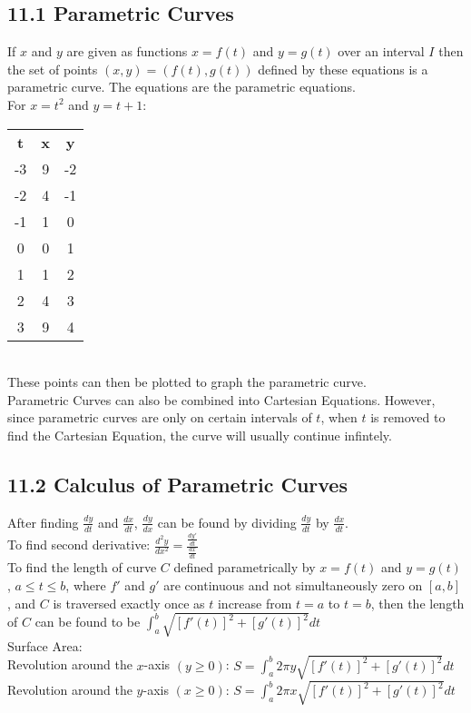\documentclass{article}
\begin{document}
        \subsection*{11.1 Parametric Curves}
            If $x$ and $y$ are given as functions $x=f(t)$ and $y=g(t)$ over an interval $I$ then the set of points $(x, y) = (f(t), g(t))$ defined by these equations is a parametric curve. The equations are the parametric equations. \\
            For $x=t^2$ and $y=t+1$: \\
            \begin{tabular}{ c c c }
                \textbf{t} & \textbf{x} & \textbf{y} \\
                -3 & 9 & -2 \\
                -2 & 4 & -1 \\
                -1 & 1 &  0 \\
                 0 & 0 &  1 \\
                 1 & 1 &  2 \\
                 2 & 4 &  3 \\
                 3 & 9 &  4 \\
            \end{tabular}
            \\
            These points can then be plotted to graph the parametric curve. \\
            Parametric Curves can also be combined into Cartesian Equations. However, since parametric curves are only on certain intervals of $t$, when $t$ is removed to find the Cartesian Equation, the curve will usually continue infintely. \\
        \color{JungleGreen}
        \subsection*{11.2 Calculus of Parametric Curves}
            After finding $\frac{dy}{dt}$ and $\frac{dx}{dt}$, $\frac{dy}{dx}$ can be found by dividing $\frac{dy}{dt}$ by $\frac{dx}{dt}$. \\
            To find second derivative: $\frac{d^2y}{dx^2} = \frac{\frac{dy'}{dt}}{\frac{dx}{dt}}$ \\
            To find the length of curve $C$ defined parametrically by $x=f(t)$ and $y=g(t)$, $a \leq t \leq b$, where $f'$ and $g'$ are continuous and not simultaneously zero on $[a, b]$, and $C$ is traversed exactly once as $t$ increase from $t=a$ to $t=b$, then the length of $C$ can be found to be $\int_{a}^{b} \sqrt{[f'(t)]^2 + [g'(t)]^2} dt$ \\
            Surface Area: \\
            Revolution around the $x$-axis $(y \geq 0)$: $S = \int_{a}^{b} 2 \pi y \sqrt{[f'(t)]^2 + [g'(t)]^2} dt$ \\
            Revolution around the $y$-axis $(x \geq 0)$: $S = \int_{a}^{b} 2 \pi x \sqrt{[f'(t)]^2 + [g'(t)]^2} dt$ \\
\end{document}
